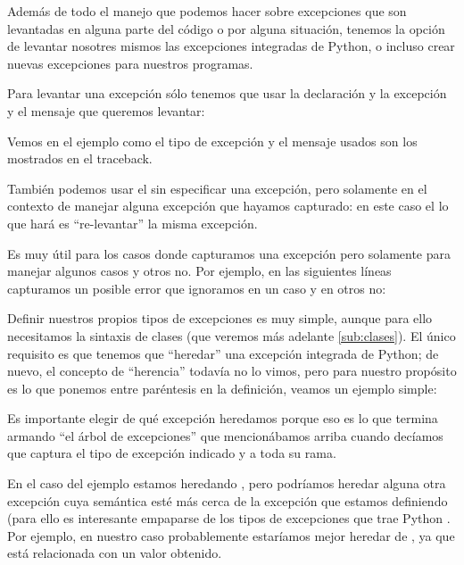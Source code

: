 Además de todo el manejo que podemos hacer sobre excepciones que son levantadas en alguna parte del código o por alguna situación, tenemos la opción de levantar nosotres mismos las excepciones integradas de Python, o incluso crear nuevas excepciones para nuestros programas.

Para levantar una excepción sólo tenemos que usar la declaración  y la excepción y el mensaje que queremos levantar:


Vemos en el ejemplo como el tipo de excepción y el mensaje usados son los mostrados en el traceback.

También podemos usar el  sin especificar una excepción, pero solamente en el contexto de manejar alguna excepción que hayamos capturado: en este caso el  lo que hará es ``re-levantar'' la misma excepción. 

Es muy útil para los casos donde capturamos una excepción pero solamente para manejar algunos casos y otros no. Por ejemplo, en las siguientes líneas capturamos un posible error que ignoramos en un caso y en otros no:


Definir nuestros propios tipos de excepciones es muy simple, aunque para ello necesitamos la sintaxis de clases (que veremos más adelante \ref{sub:clases}). El único requisito es que tenemos que ``heredar'' una excepción integrada de Python; de nuevo, el concepto de ``herencia'' todavía no lo vimos, pero para nuestro propósito es lo que ponemos entre paréntesis en la definición, veamos un ejemplo simple:


Es importante elegir de qué excepción heredamos porque eso es lo que termina armando ``el árbol de excepciones'' que mencionábamos arriba cuando decíamos que  captura el tipo de excepción indicado y a toda su rama.

En el caso del ejemplo estamos heredando , pero podríamos heredar alguna otra excepción cuya semántica esté más cerca de la excepción que estamos definiendo (para ello es interesante empaparse de los tipos de excepciones que trae Python \cite{stdlib_exceptypes}. Por ejemplo, en nuestro caso probablemente estaríamos mejor heredar de , ya que está relacionada con un valor obtenido.

